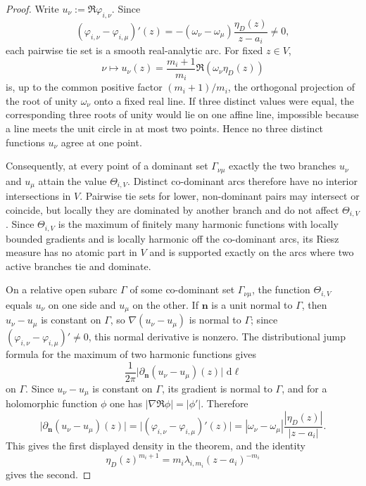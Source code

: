 \documentclass[reqno]{article}
\theoremstyle{definition}
\theoremstyle{remark}
\theoremstyle{plain}
\newcommand{\dd}{\,\mathrm d}
\begin{document}
\begin{proof}
Write $u_\nu:=\Re\varphi_{i,\nu}$. Since
\[
(\varphi_{i,\nu}-\varphi_{i,\mu})'(z)
=-(\omega_\nu-\omega_\mu)\frac{\eta_D(z)}{z-a_i}\ne0,
\]
each pairwise tie set is a smooth real-analytic arc. For fixed $z\in V$,
\[
\nu\mapsto u_\nu(z)=\frac{m_i+1}{m_i}\Re(\omega_\nu\eta_D(z))
\]
is, up to the common positive factor $(m_i+1)/m_i$, the orthogonal projection of the root of unity $\omega_\nu$ onto a fixed real line. If three distinct values were equal, the corresponding three roots of unity would lie on one affine line, impossible because a line meets the unit circle in at most two points. Hence no three distinct functions $u_\nu$ agree at one point.

Consequently, at every point of a dominant set $\Gamma_{\nu\mu}$ exactly the two branches $u_\nu$ and $u_\mu$ attain the value $\Theta_{i,V}$. Distinct co-dominant arcs therefore have no interior intersections in $V$. Pairwise tie sets for lower, non-dominant pairs may intersect or coincide, but locally they are dominated by another branch and do not affect $\Theta_{i,V}$. Since $\Theta_{i,V}$ is the maximum of finitely many harmonic functions with locally bounded gradients and is locally harmonic off the co-dominant arcs, its Riesz measure has no atomic part in $V$ and is supported exactly on the arcs where two active branches tie and dominate.

On a relative open subarc \(\Gamma\) of some co-dominant set \(\Gamma_{\nu\mu}\), the function \(\Theta_{i,V}\) equals \(u_\nu\) on one side and \(u_\mu\) on the other. If \(\mathbf n\) is a unit normal to \(\Gamma\), then \(u_\nu-u_\mu\) is constant on \(\Gamma\), so \(\nabla(u_\nu-u_\mu)\) is normal to \(\Gamma\); since \((\varphi_{i,\nu}-\varphi_{i,\mu})'\ne0\), this normal derivative is nonzero. The distributional jump formula for the maximum of two harmonic functions gives
\[
\frac{1}{2\pi}\bigl|\partial_{\mathbf n}(u_\nu-u_\mu)(z)\bigr|\,\dd\ell
\]
on $\Gamma$. Since $u_\nu-u_\mu$ is constant on $\Gamma$, its gradient is normal to $\Gamma$, and for a holomorphic function $\phi$ one has $|\nabla\Re\phi|=|\phi'|$. Therefore
\[
\bigl|\partial_{\mathbf n}(u_\nu-u_\mu)(z)\bigr|
=\bigl|(\varphi_{i,\nu}-\varphi_{i,\mu})'(z)\bigr|
=|\omega_\nu-\omega_\mu|\frac{|\eta_D(z)|}{|z-a_i|}.
\]
This gives the first displayed density in the theorem, and the identity
\[
\eta_D(z)^{m_i+1}=m_i\lambda_{i,m_i}(z-a_i)^{-m_i}
\]
gives the second.


\end{proof}
\end{document}
